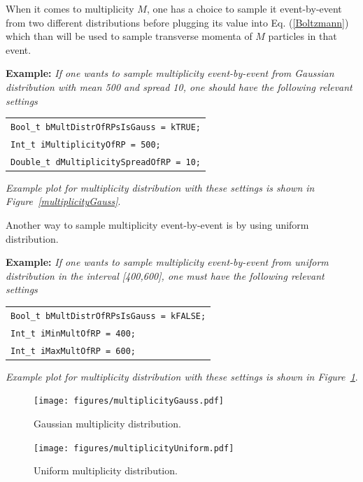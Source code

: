\documentclass[a4paper]{book}
\numberwithin{equation}{subsection}
\begin{document}
When it comes to multiplicity $M$, one has a choice to sample it event-by-event from two different distributions before plugging its value into Eq. (\ref{Boltzmann}) which than will be used to sample transverse momenta of $M$ particles in that event. 

\vspace{0.5cm}
\noindent\textbf{Example:} \textit{If one wants to sample multiplicity event-by-event from Gaussian distribution with mean 500 and spread 10, one should have the following relevant settings}
%
\begin{center}
\begin{tabular}[t]{l}
\texttt{Bool\_t bMultDistrOfRPsIsGauss = kTRUE;} \\
\texttt{Int\_t iMultiplicityOfRP = 500;} \\
\texttt{Double\_t dMultiplicitySpreadOfRP = 10;}
\end{tabular}
\end{center}
%
\textit{Example plot for multiplicity distribution with these settings is shown in Figure~\ref{multiplicityGauss}}.
\vspace{0.5cm}

\noindent Another way to sample multiplicity event-by-event is by using uniform distribution.

\vspace{0.5cm}
\noindent\textbf{Example:} \textit{If one wants to sample multiplicity event-by-event from uniform distribution in the interval [400,600], one must have the following relevant settings}
%
\begin{center}
\begin{tabular}[t]{l}
\texttt{Bool\_t bMultDistrOfRPsIsGauss = kFALSE;} \\
\texttt{Int\_t iMinMultOfRP = 400;} \\
\texttt{Int\_t iMaxMultOfRP = 600;}
\end{tabular}
\end{center}
%
\textit{Example plot for multiplicity distribution with these settings is shown in Figure~\ref{multiplicityUniform}}.
\vspace{0.5cm}

\begin{figure}
\begin{minipage}[t]{0.5\linewidth} %
\centering
\texttt{[image: figures/multiplicityGauss.pdf]}
\caption{Gaussian multiplicity distribution.}
\label{multiplicityGauss}
\end{minipage}
\hspace{0.5cm} %
\begin{minipage}[t]{0.5\linewidth}
\centering
\texttt{[image: figures/multiplicityUniform.pdf]}
\caption{Uniform multiplicity distribution.}
\label{multiplicityUniform}
\end{minipage}
\end{figure} 
\end{document}
